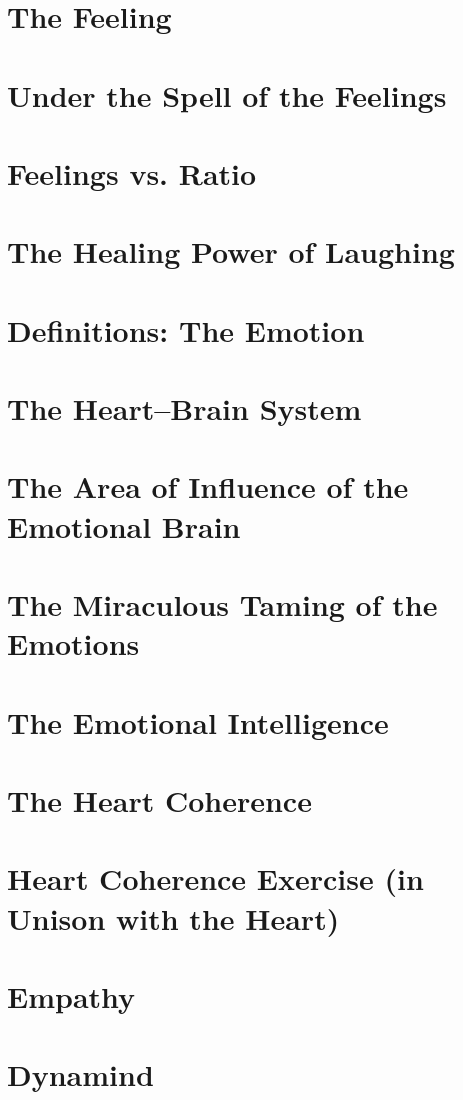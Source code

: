 \documentclass[../main.tex]{subfiles}
\begin{document}
\chapter{The Feeling}


\chapter{Under the Spell of the Feelings}


\chapter{Feelings vs.  Ratio}


\chapter{The Healing Power of Laughing}


\chapter{Definitions: The Emotion}


\chapter{The Heart--Brain System}


\chapter[Influence of the Emotional Brain]{The Area of Influence of the Emotional Brain}


\chapter{The Miraculous Taming of the Emotions}


\chapter{The Emotional Intelligence}


\chapter{The Heart Coherence}


\chapter[Heart Coherence Exercise]{Heart Coherence Exercise (in Unison with the Heart)}


\chapter{Empathy}


\chapter{Dynamind}

\end{document}
